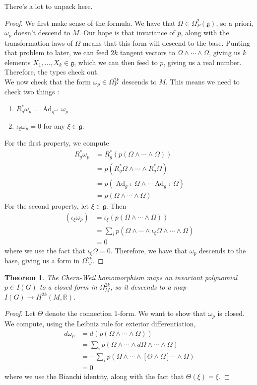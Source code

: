 \documentclass[psamsfonts, 12pt]{amsart}
\newtheorem{thm}{Theorem}[section]
\theoremstyle{definition}
\theoremstyle{remark}
\newcommand{\R}{\mathbb{R}}
\newcommand{\g}{\mathfrak{g}}
\newcommand{\inv}{^{-1}}
\DeclareMathOperator{\Ad}{Ad}
\begin{document}
%
There's a lot to unpack here.
\begin{proof}
We first make sense of the formula. We have that $\Omega \in \Omega^2_P(\g)$, so
a priori, $\omega_p$ doesn't descend to $M$. Our hope is that invariance of $p$, along
with the transformation laws of $\Omega$ means that this form will descend to the base.
Punting that problem to later, we can feed $2k$ tangent vectors to
$\Omega \wedge\cdots\wedge \Omega$, giving us $k$ elements $X_1,\ldots, X_k \in \g$, which
we can then feed to $p$, giving us a real number. Therefore, the types check out. \\

We now check that the form $\omega_p \in \Omega^{2k}_P$ descends to $M$. This means we
need to check two things :
\begin{enumerate}
  \item $R_g^*\omega_p = \Ad_{g\inv}\omega_p$
  \item $\iota_\xi\omega_p = 0$ for any $\xi \in \g$.
\end{enumerate}
For the first property, we compute
\begin{align*}
R_g^*\omega_p &= R_g^*(p(\Omega \wedge\cdots\wedge\Omega)) \\
&= p(R_g^*\Omega \wedge \cdots \wedge R_g^*\Omega) \\
&= p(\Ad_{g\inv}\Omega \wedge\cdots\Ad_{g\inv}\Omega) \\
&= p(\Omega\wedge\cdots\wedge\Omega)
\end{align*}
For the second property, let $\xi\in \g$. Then
\begin{align*}
(\iota_\xi\omega_p)
&= \iota_\xi(p(\Omega\wedge\cdots\wedge\Omega)) \\
&= \sum_i p(\Omega\wedge\cdots\wedge\iota_\xi\Omega\wedge\cdots\wedge\Omega) \\
&= 0
\end{align*}
where we use the fact that $\iota_\xi\Omega = 0$. Therefore, we have that
$\omega_p$ descends to the base, giving us a form in $\Omega^{2k}_M$.
\end{proof}
%
\begin{thm}
The Chern-Weil homomorphism maps an invariant polynomial $p \in I(G)$ to a closed
form in $\Omega^{2k}_M$, so it descends to a map $I(G) \to H^{2k}(M,\R)$.
\end{thm}
%
\begin{proof}
Let $\Theta$ denote the connection $1$-form. We want to show that
$\omega_p$ is closed. We compute, using the Leibniz rule for exterior differentiation,
\begin{align*}
d\omega_p &= d(p(\Omega \wedge\cdots\wedge\Omega)) \\
&= \sum_i p(\Omega\wedge\cdots\wedge d\Omega\wedge\cdots\wedge\Omega) \\
&= -\sum_i p(\Omega\wedge\cdots\wedge [\Theta\wedge\Omega]\cdots\wedge\Omega) \\
&= 0
\end{align*}
where we use the Bianchi identity, along with the fact that $\Theta(\xi) = \xi$.
\end{proof}
%
\end{document}
